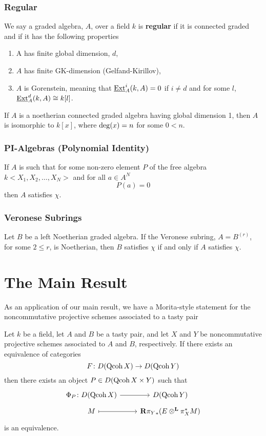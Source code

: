 \documentclass[reqno, 12pt]{amsart}
\begin{document}
\subsubsection{\cite{AS} Regular}
We say a graded algebra, $A$, over a field $k$ is \textbf{regular} if it is connected graded and if it has the following properties
\begin{enumerate}
\item
  A has finite global dimension, $d$,
\item
  $A$ has finite GK-dimension (Gelfand-Kirillov),
\item
  $A$ is Gorenstein, meaning that $\underline{\operatorname{Ext}}^i_A(k,A) = 0$ if $i \neq d$ and for some $l$, $\underline{\operatorname{Ext}}^d_A(k,A) \cong k[l]$.
\end{enumerate}

\begin{remark}
  If $A$ is a noetherian connected graded algebra having global dimension 1, then $A$ is isomorphic to $k[x]$, where $\operatorname{deg}(x) = n$ for some $0 < n$.
\end{remark}

\subsubsection{PI-Algebras (Polynomial Identity)}
If $A$ is such that for some non-zero element $P$ of the free algebra $k<X_1, X_2, \ldots, X_N>$ and for all $a \in A^N$
$$P(a) = 0$$
then $A$ satisfies $\chi$.

\subsubsection{Veronese Subrings}
Let $B$ be a left Noetherian graded algebra.
If the Veronese subring, $A = B^{(r)}$, for some $2 \leq r$, is Noetherian, then $B$ satisfies $\chi$ if and only if $A$ satisfies $\chi$.
\section{The Main Result}
As an application of our main result, we have a Morita-style statement for the noncommutative projective schemes associated to a tasty pair
\begin{theorem}[Ballard, F.]
  Let $k$ be a field, let $A$ and $B$ be a tasty pair, and let $X$ and $Y$ be noncommutative projective schemes associated to $A$ and $B$, respectively.
  If there exists an equivalence of categories
  $$F \colon D(\operatorname{Qcoh}X) \to D(\operatorname{Qcoh}Y)$$
  then there exists an object $P \in D(\operatorname{Qcoh}X \times Y)$ such that
  $$\begin{tikzcd}[row sep=tiny]
    \Phi_P \colon D(\Qcoh{X}) \arrow{r}& D(\Qcoh{Y})\\
    M \arrow[mapsto]{r} & \mathbf{R}{\pi_Y}_\ast(E \otimes^\mathbf{L} \pi_X^\ast M)
  \end{tikzcd}$$
  is an equivalence.
\end{theorem}
\end{document}
